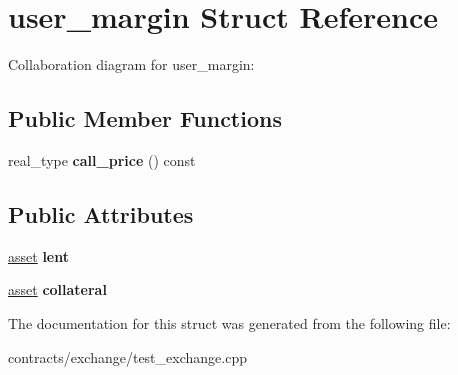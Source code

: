 \hypertarget{structuser__margin}{}\section{user\+\_\+margin Struct Reference}
\label{structuser__margin}


Collaboration diagram for user\+\_\+margin\+:
\subsection*{Public Member Functions}
\begin{DoxyCompactItemize}
\item 
\mbox{\label{structuser__margin_a241320b435ef502efc179cb3a20a8d3f}} 
real\+\_\+type {\bfseries call\+\_\+price} () const
\end{DoxyCompactItemize}
\subsection*{Public Attributes}
\begin{DoxyCompactItemize}
\item 
\mbox{\label{structuser__margin_a6a85b57e2f61f548d2b18681c51baf5f}} 
\mbox{\hyperlink{structasset}{asset}} {\bfseries lent}
\item 
\mbox{\label{structuser__margin_a0cef03cefda680e160b959cf9d6919d9}} 
\mbox{\hyperlink{structasset}{asset}} {\bfseries collateral}
\end{DoxyCompactItemize}


The documentation for this struct was generated from the following file\+:\begin{DoxyCompactItemize}
\item 
contracts/exchange/test\+\_\+exchange.\+cpp\end{DoxyCompactItemize}
